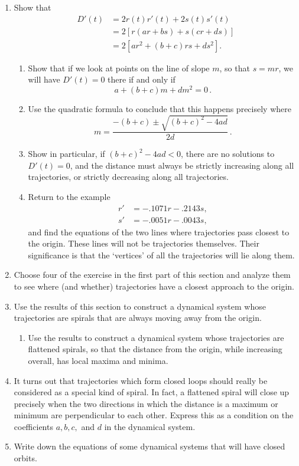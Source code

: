 \begin{enumerate}
\item Show that
\begin{align*}
D'(t) &= 2 r(t)r'(t) + 2 s(t)s'(t)\\
      &= 2[r(ar+bs)+s(cr+ds)]\\
      &= 2[ar^2+(b+c)rs+ds^2].
\end{align*}


  \begin{enumerate}
  \item Show that if we look at points on the line of slope $m$, so that
$s=mr$, we will have $D'(t)=0$ there if and only if
        \[
a+(b+c)m+dm^2=0\, .
\]


  \item Use the quadratic formula to conclude that this happens precisely
where
        \[
m=\frac{-(b+c) \pm \sqrt{(b+c)^2-4ad}}{2d}\, .
\]


  \item Show in particular, if $(b+c)^2-4ad<0$, there are no solutions to
$D'(t)=0$, and the distance must always be strictly increasing along
all trajectories, or strictly decreasing along all trajectories.

  \item Return to the example
\begin{align*}
r' &=  -.1071r -.2143s, \\
s' &=  -.0051r - .0043s,
\end{align*}
and find the equations of the two lines where trajectories pass
closest to the origin.  These lines will not be trajectories
themselves.  Their significance is that the `vertices' of all the
trajectories will lie along them.


\end{enumerate}
\item Choose four of the exercise in the first part of this section and
analyze them to see where (and whether) trajectories have a closest
approach to the origin.


\item Use the results of this section to construct a dynamical system
whose trajectories are spirals that are always moving away from the
origin.

  \begin{enumerate}
  \item Use the results to construct a dynamical system whose
trajectories are flattened spirals, so that the distance from the
origin, while increasing overall, has local maxima and minima.


\end{enumerate}
\item It turns out that trajectories which form closed loops should
really be considered as a special kind of spiral.  In fact, a
flattened spiral will close up precisely when the two directions in
which the distance is a maximum or minimum are perpendicular to each
other.  Express this as a condition on the coefficients $a, b, c, $
and $d$ in the dynamical system.


\item Write down the equations of some dynamical systems that will have
closed orbits.


\end{enumerate}
